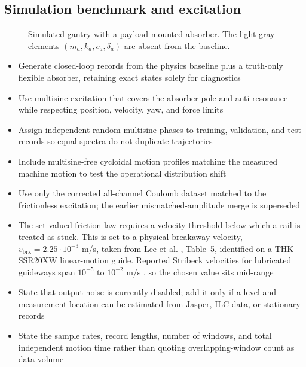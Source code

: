 \subsection{Simulation benchmark and excitation}
\begin{figure}[t]
  \centering
  \resizebox{\columnwidth}{!}{}
  \caption{Simulated gantry with a payload-mounted absorber. The light-gray
  elements $(m_a,k_a,c_a,\delta_a)$ are absent from the baseline.}
  \label{fig:gantry_absorber}
\end{figure}
\begin{itemize}
\item Generate closed-loop records from the physics baseline plus a truth-only flexible absorber, retaining exact states solely for diagnostics
\item Use multisine excitation that covers the absorber pole and anti-resonance while respecting position, velocity, yaw, and force limits
\item Assign independent random multisine phases to training, validation, and test records so equal spectra do not duplicate trajectories
\item Include multisine-free cycloidal motion profiles matching the measured machine motion to test the operational distribution shift
\item Use only the corrected all-channel Coulomb dataset matched to the frictionless excitation; the earlier mismatched-amplitude merge is superseded
\item The set-valued friction law requires a velocity threshold below which a rail is treated as stuck. This is set to a physical breakaway velocity, $v_{\mathrm{brk}} = 2.25\cdot10^{-3}$ m/s, taken from Lee et al. \cite{lee2020feeddrive}, Table~5, identified on a THK SSR20XW linear-motion guide. Reported Stribeck velocities for lubricated guideways span $10^{-5}$ to $10^{-2}$ m/s \cite[Sec.~5.2]{lee2020feeddrive}, so the chosen value sits mid-range
\item State that output noise is currently disabled; add it only if a level and measurement location can be estimated from Jasper, ILC data, or stationary records
\item State the sample rates, record lengths, number of windows, and total independent motion time rather than quoting overlapping-window count as data volume

\end{itemize}
